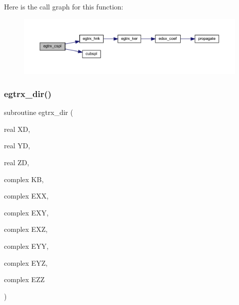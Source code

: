 Here is the call graph for this function\+:\nopagebreak
\begin{figure}[H]
\begin{center}
\leavevmode
\includegraphics[width=350pt]{Leroi__c_8f90_a10fd9ada0ec15151a8112666c09a245d_cgraph}
\end{center}
\end{figure}
\mbox{\label{Leroi__c_8f90_a6bbebe0c58cc288fcd56628de8860916}} 
\subsubsection{\texorpdfstring{egtrx\+\_\+dir()}{egtrx\_dir()}}
{\footnotesize\ttfamily subroutine egtrx\+\_\+dir (\begin{DoxyParamCaption}\item[{real}]{XD,  }\item[{real}]{YD,  }\item[{real}]{ZD,  }\item[{complex}]{KB,  }\item[{complex}]{E\+XX,  }\item[{complex}]{E\+XY,  }\item[{complex}]{E\+XZ,  }\item[{complex}]{E\+YY,  }\item[{complex}]{E\+YZ,  }\item[{complex}]{E\+ZZ }\end{DoxyParamCaption})}

\mbox{\label{Leroi__c_8f90_a5489646b1d19d3a2a814c56265bd78fb}} 
